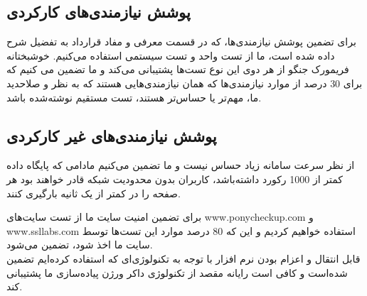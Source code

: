 \subsection* {پوشش نیازمندی‌های کارکردی}
‌برای تضمین پوشش نیازمندی‌ها، که در قسمت معرفی و مفاد قرارداد به تفضیل شرح داده شده است، ما از تست واحد و تست سیستمی استفاده می‌کنیم. خوشبختانه ‌فریمورک جنگو از هر دوی این نوع تست‌ها پشتیبانی می‌کند و ما تضمین می کنیم که برای 30 درصد از موارد نیازمندی‌ها که همان نیازمندی‌هایی هستند که به نظر و صلاحدید ما، مهم‌تر یا حساس‌تر هستند، تست مستقیم نوشته‌شده باشد.

\subsection* {پوشش نیازمندی‌های غیر کارکردی}
از نظر سرعت سامانه زیاد حساس نیست و ما تضمین می‌کنیم مادامی که پایگاه داده کمتر از 1000 رکورد داشته‌باشد، کاربران بدون محدودیت شبکه قادر خواهند بود هر صفحه را در کمتر از یک ثانیه بارگیری کنند. 

برای تضمین امنیت سایت ما از تست سایت‌های www.ponycheckup.com و www.ssllabs.com استفاده خواهیم کردیم  و این که 80 درصد موارد این تست‌ها توسط سایت ما اخذ شود، تضمین می‌شود. \\
قابل انتقال و اعزام بودن نرم افزار با توجه به تکنولوژی‌ای که استفاده کرده‌ایم تضمین شده‌است و کافی است رایانه مقصد از تکنولوژی داکر ورژن پیاده‌سازی ما پشتیبانی کند. 
